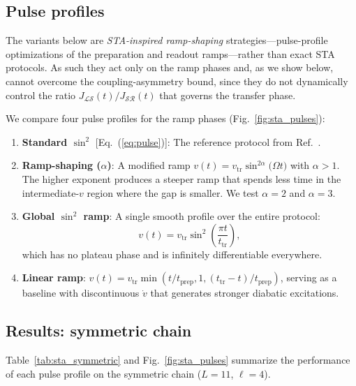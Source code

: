 \documentclass[
  reprint,
  amsmath,
  amssymb,
  aps,
  prb,
  floatfix,
  longbibliography,
]{revtex4-2}
\newcommand{\ttr}{t_{\mathrm{tr}}}
\newcommand{\tprep}{t_{\mathrm{prep}}}
\newcommand{\JLS}{J_{\mathcal{LS}}}
\newcommand{\JSR}{J_{\mathcal{SR}}}
\begin{document}
\subsection{Pulse profiles}
\label{sec:pulses}

The variants below are \emph{STA-inspired ramp-shaping} strategies---pulse-profile
optimizations of the preparation and readout ramps---rather than exact STA
protocols. As such they act only on the ramp phases and, as we show below, cannot
overcome the coupling-asymmetry bound, since they do not dynamically control the
ratio $\JLS(t)/\JSR(t)$ that governs the transfer phase.

We compare four pulse profiles for the ramp phases (Fig.~\ref{fig:sta_pulses}):

\begin{enumerate}
  \item \textbf{Standard $\sin^2$} [Eq.~(\ref{eq:pulse})]: The reference
    protocol from Ref.~\cite{Zurita2023}.
  \item \textbf{Ramp-shaping ($\alpha$)}: A modified ramp $v(t) = v_{\mathrm{tr}}
    \sin^{2\alpha}\!\bigl(\Omega t\bigr)$ with $\alpha > 1$. The higher
    exponent produces a steeper ramp that spends less time in the
    intermediate-$v$ region where the gap is smaller. We test $\alpha = 2$ and $\alpha = 3$.
  \item \textbf{Global $\sin^2$ ramp}: A single smooth profile over the entire
    protocol:
    \begin{equation}
      v(t) = v_{\mathrm{tr}} \sin^2\!\left(\frac{\pi t}{\ttr}\right),
      \label{eq:global_sin2}
    \end{equation}
    which has no plateau phase and is infinitely differentiable everywhere.
  \item \textbf{Linear ramp}: $v(t) = v_{\mathrm{tr}} \min(t/\tprep, 1,
    (\ttr - t)/\tprep)$, serving as a baseline with discontinuous $\dot{v}$
    that generates stronger diabatic excitations.
\end{enumerate}

\subsection{Results: symmetric chain}
\label{sec:sta_symmetric}

Table~\ref{tab:sta_symmetric} and Fig.~\ref{fig:sta_pulses} summarize the
performance of each pulse profile on the symmetric chain ($L = 11$, $\ell = 4$).
\end{document}
